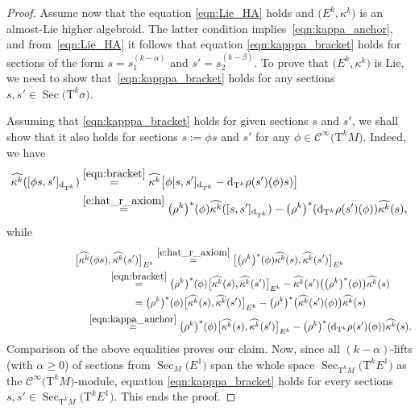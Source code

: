 \documentclass[pdftex]{sigma}
\newcommand{\wh}[1]{\widehat{#1}} %
\newcommand{\Sec}{\operatorname{Sec}}
\newcommand{\dd}{\mathrm{d}}
\newcommand{\T}{\mathrm{T}} %
\newcommand{\TT}[1]{\mathrm{T}^{#1}} %
\newcommand{\Cf}{\mathcal{C}^\infty}
\numberwithin{equation}{section}
\theoremstyle{definition}
\begin{document}
\begin{proof}
Assume now that the equation \eqref{eqn:Lie_HA} holds and $\big(E^k,\kappa^k\big)$ is an almost-Lie higher algebroid. The latter condition implies~\eqref{eqn:kappa_anchor}, and from~\eqref{eqn:Lie_HA} it follows that equation \eqref{eqn:kapppa_bracket} holds for sections of the form $s=s_1^{(k-\alpha)}$ and $s'=s_2^{(k-\beta)}$. To prove that $\big(E^k,\kappa^k\big)$ is Lie, we need to show that~\eqref{eqn:kapppa_bracket} holds for any sections $s, s'\in \Sec\big(\T^k \sigma\big)$.

 Assuming that \eqref{eqn:kapppa_bracket} holds for given sections $s$ and $s'$, we shall show that it also holds for sections $s:=\phi s$ and $s'$ for any $\phi\in \Cf\big(\T^k M\big)$. Indeed, we have
\begin{gather*}\begin{split}&
\wh{\kappa^k}([\phi s,s']_{\dd_{\TT{k}}}) \overset{\eqref{eqn:bracket}}= \wh{\kappa^k}\big[\phi [ s,s']_{\dd_{\TT{k}}} - {\dd_{\TT{k}}}\rho(s')(\phi) s)\big] \\
& \hphantom{\wh{\kappa^k}([\phi s,s']_{\dd_{\TT{k}}})}{} \overset{\eqref{e:hat_r_axiom}}= \big(\rho^k\big)^\ast (\phi) \wh{\kappa^k}([s, s']_{\dd_{\TT{k}}}) -
\big(\rho^k\big)^\ast ({\dd_{\TT{k}}}\rho(s')(\phi))\wh{\kappa^k}(s) ,\end{split}	
\end{gather*}
while
\begin{gather*}
\big[\wh{\kappa^k}(\phi s),\wh{\kappa^k}(s')\big]_{E^k} \overset{\eqref{e:hat_r_axiom}}= \big[\big(\rho^k\big)^\ast (\phi)\wh{\kappa^k}(s),\wh{\kappa^k}(s')\big]_{E^k}\\
\hphantom{\big[\wh{\kappa^k}(\phi s),\wh{\kappa^k}(s')\big]_{E^k}}{} \overset{\eqref{eqn:bracket}}= \big(\rho^k\big)^\ast (\phi)\big[\wh{\kappa^k}(s),\wh{\kappa^k}(s')\big]_{E^k} - \wh{\kappa^k}(s')\big(\big(\rho^k\big)^\ast(\phi)\big) \wh{\kappa^k}(s)\\
\hphantom{\big[\wh{\kappa^k}(\phi s),\wh{\kappa^k}(s')\big]_{E^k}}{} = \big(\rho^k\big)^\ast (\phi)\big[\wh{\kappa^k}(s),\wh{\kappa^k}(s')\big]_{E^k} - \big(\rho^k\big)^\ast\big(\wh{\kappa^k}(s')(\phi)\big) \wh{\kappa^k}(s)\\
\hphantom{\big[\wh{\kappa^k}(\phi s),\wh{\kappa^k}(s')\big]_{E^k}}{} \overset{\eqref{eqn:kappa_anchor}}= \big(\rho^k\big)^\ast (\phi)\big[\wh{\kappa^k}(s),\wh{\kappa^k}(s')\big]_{E^k} - \big(\rho^k\big)^\ast(\dd_{\TT k}\rho(s')(\phi)) \wh{\kappa^k}(s) .
\end{gather*} Comparison of the above equalities proves our claim.
Now, since all $(k-\alpha)$-lifts (with $\alpha\geq 0$) of sections from $\Sec_M\big(E^1\big)$ span the whole space $\Sec_{\TT{k} M}\big(\TT{k} E^1\big)$ as the $\Cf\big(\TT k M\big)$-module, equation \eqref{eqn:kapppa_bracket} holds for every sections $s,s'\in \Sec_{\TT{k} M}\big(\TT{k} E^1\big)$. This ends the proof.
\end{proof}
\end{document}
